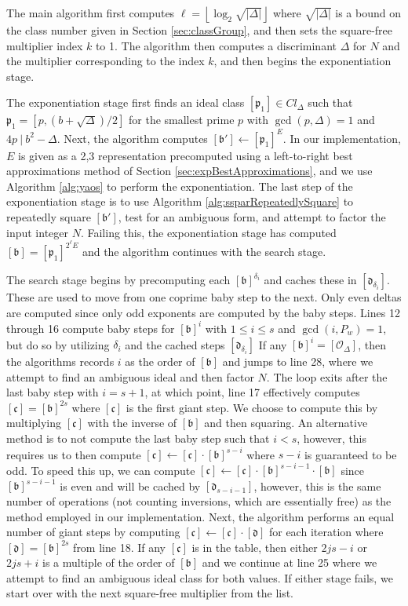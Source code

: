 \documentclass{ucalgthes1}
\theoremstyle{definition}
\newcommand{\floor}[1]{\left\lfloor #1 \right\rfloor}
\newcommand{\ideal}{\mathfrak}
\newcommand{\idealclass}[1]{\left[ \ideal #1 \right]}
\newcommand{\bclass}{\idealclass b}
\newcommand{\cclass}{\idealclass c}
\newcommand{\dclass}{\idealclass d}
\newcommand{\idclass}{[\mathcal O_\Delta]}
\newcommand{\hdelta}{\sqrt{|\Delta|}}
\begin{document}
The main algorithm first computes $\ell = \floor{\log_2 \hdelta}$ where $\hdelta$ is a bound on the class number given in Section \ref{sec:classGroup}, and then sets the square-free multiplier index $k$ to 1.  The algorithm then computes a discriminant $\Delta$ for $N$ and the multiplier corresponding to the index $k$, and then begins the exponentiation stage.

The exponentiation stage first finds an ideal class $\idealclass{p_1} \in Cl_\Delta$ such that $\ideal{p_1} = [p, (b + \sqrt\Delta)/2]$ for the smallest prime $p$ with $\gcd(p, \Delta) = 1$ and $4p ~|~ b^2 - \Delta$. Next, the algorithm computes $\idealclass{b'} \gets \idealclass{p_1}^E$.  In our implementation, $E$ is given as a 2,3 representation precomputed using a left-to-right best approximations method of Section \ref{sec:expBestApproximations}, and we use Algorithm \ref{alg:yaos} to perform the exponentiation.  The last step of the exponentiation stage is to use Algorithm \ref{alg:ssparRepeatedlySquare} to repeatedly square $\idealclass{b'}$, test for an ambiguous form, and attempt to factor the input integer $N$.  Failing this, the exponentiation stage has computed $\bclass = \idealclass{p_1}^{2^\ell E}$ and the algorithm continues with the search stage.

The search stage begins by precomputing each $\bclass^{\delta_i}$ and caches these in $\idealclass{d_{\delta_i}}$.  These are used to move from one coprime baby step to the next.  Only even deltas are computed since only odd exponents are computed by the baby steps.  Lines 12 through 16 compute baby steps for $\bclass^i$ with $1 \le i \le s$ and $\gcd(i, P_w) = 1$, but do so by utilizing $\delta_i$ and the cached steps $\idealclass{d_{\delta_i}}$  If any $\bclass^i = \idclass$, then the algorithms records $i$ as the order of $\bclass$ and jumps to line 28, where we attempt to find an ambiguous ideal and then factor $N$.  The loop exits after the last baby step with $i = s+1$, at which point, line 17 effectively computes $\cclass = \bclass^{2s}$ where $\cclass$ is the first giant step.  We choose to compute this by multiplying $\cclass$ with the inverse of $\bclass$ and then squaring.  An alternative method is to not compute the last baby step such that $i < s$, however, this requires us to then compute $\cclass \gets \cclass \cdot \bclass^{s-i}$ where $s-i$ is guaranteed to be odd.  To speed this up, we can compute $\cclass \gets \cclass \cdot \bclass^{s-i-1} \cdot \bclass$ since $\bclass^{s-i-1}$ is even and will be cached by $\idealclass{d_{s-i-1}}$, however, this is the same number of operations (not counting inversions, which are essentially free) as the method employed in our implementation.  Next, the algorithm performs an equal number of giant steps by computing $\cclass \gets \cclass \cdot \dclass$ for each iteration where $\dclass = \bclass^{2s}$ from line 18.  If any $\cclass$ is in the table, then either $2js-i$ or $2js+i$ is a multiple of the order of $\bclass$ and we continue at line 25 where we attempt to find an ambiguous ideal class for both values.  If either stage fails, we start over with the next square-free multiplier from the list.
\end{document}

